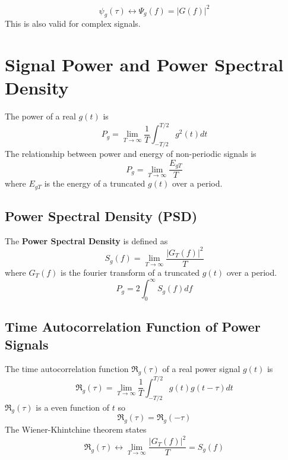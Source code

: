 \documentclass{article}
\begin{document}
    \begin{equation}
        \psi_g(\tau) \leftrightarrow \varPsi_g(f) = |G(f)|^2
    \end{equation}
    This is also valid for complex signals.

    \section{Signal Power and Power Spectral Density}
    The power of a real $g(t)$ is
    \begin{equation}
        P_g = \lim_{T \rightarrow \infty}\frac{1}{T}\int_{-T/2}^{T/2}g^2(t)dt
    \end{equation}
    The relationship between power and energy of non-periodic signals is 
    \begin{equation}
        P_g = \lim_{T \rightarrow \infty}\frac{E_{gT}}{T}
    \end{equation}
    where $E_{gT}$ is the energy of a truncated $g(t)$ over a period. 

    \subsection{Power Spectral Density (PSD)}
    The \textbf{Power Spectral Density} is defined as
    \begin{equation}
        S_g(f) = \lim_{T \rightarrow \infty} \frac{|G_T(f)|^2}{T}
    \end{equation}
    where $G_T(f)$ is the fourier transform of a truncated $g(t)$ over a period.
    \begin{equation}
        P_g = 2\int_{0}^{\infty}S_g(f)df
    \end{equation}

    \subsection{Time Autocorrelation Function of Power Signals}
    The time autocorrelation function $\mathfrak{R}_g(\tau)$ of a real power signal $g(t)$ is
    \begin{equation}
        \mathfrak{R}_g(\tau) = \lim_{T \rightarrow \infty} \frac{1}{T}\int_{-T/2}^{T/2}g(t)g(t-\tau)dt
    \end{equation}
    $\mathfrak{R}_g(\tau)$ is a even function of $t$ so
    \begin{equation}
        \mathfrak{R}_g(\tau) = \mathfrak{R}_g(-\tau)
    \end{equation}
    The Wiener-Khintchine theorem states
    \begin{equation}
        \mathfrak{R}_g(\tau) \leftrightarrow \lim_{T \rightarrow \infty} \frac{|G_T(f)|^2}{T} = S_g(f)
    \end{equation}
\end{document}
